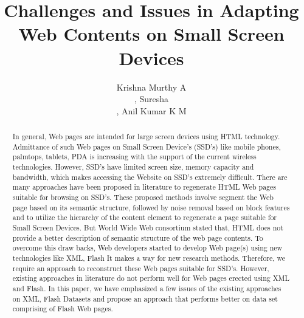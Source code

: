 \documentclass[fleqn,twoside]{article}
\title{\textbf{Challenges and Issues in Adapting Web Contents on Small Screen Devices}}
\author{Krishna Murthy A \address[DCSE]{Department of Computer Science, University of Mysore, Mysore, 570 006, India \\~Contact: krishnarjun.research@gmail.com \\},
Suresha \address[DCSE]{Department of Computer Science, University of Mysore, Mysore, 570 006, India\\~ Contact: sureshabm@yahoo.co.in\\},
Anil Kumar K M\address{Sri Jayachamarajendra College of Engineering, Mysore, India Contact: anilkmsjce@yahoo.co.in}}
\begin{document}
\begin{abstract}
In general, Web pages are intended for large screen devices using HTML technology. Admittance of such Web pages on Small Screen Device's (SSD's) like mobile phones, palmtops, tablets, PDA  is increasing with the support of the current wireless technologies. However, SSD's have limited screen size, memory capacity and bandwidth, which makes accessing the Website on SSD's extremely difficult. There are many approaches have been proposed in literature to regenerate HTML Web pages suitable for browsing on SSD's. These proposed methods involve segment the Web page based on its semantic structure, followed by noise removal based on block features and to utilize the hierarchy of the content element to regenerate a page suitable for Small Screen Devices. But World Wide Web consortium stated that, HTML does not provide a better description of semantic structure of the web page contents. To overcome this draw backs, Web developers started to develop Web page(s) using new technologies like XML, Flash  It makes a way for new research methods. Therefore, we require an approach to reconstruct these Web pages suitable for SSD's.  However, existing approaches in literature do not perform well for Web pages erected using XML and Flash. In this paper, we have emphasized a few issues of the existing approaches on XML, Flash Datasets and propose an approach that performs better on data set comprising of Flash Web pages. 
\end{abstract}

\maketitle
\end{document}
